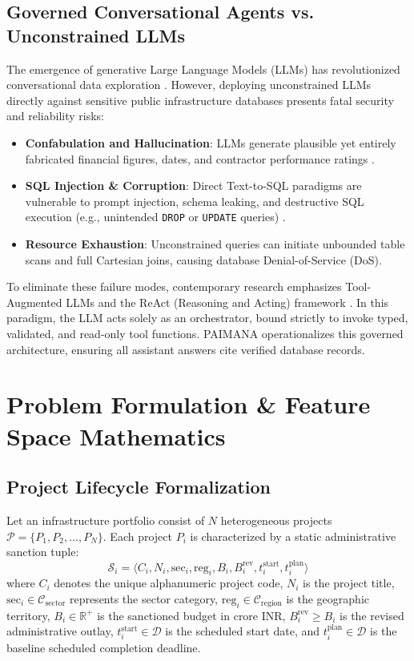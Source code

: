 \documentclass[conference]{IEEEtran}
\begin{document}
\subsection{Governed Conversational Agents vs. Unconstrained LLMs}
The emergence of generative Large Language Models (LLMs) has revolutionized conversational data exploration \cite{b13}. However, deploying unconstrained LLMs directly against sensitive public infrastructure databases presents fatal security and reliability risks:
\begin{itemize}
    \item \textbf{Confabulation and Hallucination}: LLMs generate plausible yet entirely fabricated financial figures, dates, and contractor performance ratings \cite{b14}.
    \item \textbf{SQL Injection \& Corruption}: Direct Text-to-SQL paradigms are vulnerable to prompt injection, schema leaking, and destructive SQL execution (e.g., unintended \texttt{DROP} or \texttt{UPDATE} queries) \cite{b15}.
    \item \textbf{Resource Exhaustion}: Unconstrained queries can initiate unbounded table scans and full Cartesian joins, causing database Denial-of-Service (DoS).
\end{itemize}
To eliminate these failure modes, contemporary research emphasizes Tool-Augmented LLMs and the ReAct (Reasoning and Acting) framework \cite{b16}. In this paradigm, the LLM acts solely as an orchestrator, bound strictly to invoke typed, validated, and read-only tool functions. PAIMANA operationalizes this governed architecture, ensuring all assistant answers cite verified database records.

\section{Problem Formulation \& Feature Space Mathematics}

\subsection{Project Lifecycle Formalization}
Let an infrastructure portfolio consist of $N$ heterogeneous projects $\mathcal{P} = \{P_1, P_2, \dots, P_N\}$. Each project $P_i$ is characterized by a static administrative sanction tuple:
\begin{equation}
\mathcal{S}_i = \langle C_i, N_i, \text{sec}_i, \text{reg}_i, B_i, B_i^{\text{rev}}, t_i^{\text{start}}, t_i^{\text{plan}}\rangle
\end{equation}
where $C_i$ denotes the unique alphanumeric project code, $N_i$ is the project title, $\text{sec}_i \in \mathcal{C}_{\text{sector}}$ represents the sector category, $\text{reg}_i \in \mathcal{C}_{\text{region}}$ is the geographic territory, $B_i \in \mathbb{R}^+$ is the sanctioned budget in crore INR, $B_i^{\text{rev}} \ge B_i$ is the revised administrative outlay, $t_i^{\text{start}} \in \mathcal{D}$ is the scheduled start date, and $t_i^{\text{plan}} \in \mathcal{D}$ is the baseline scheduled completion deadline.
\end{document}
